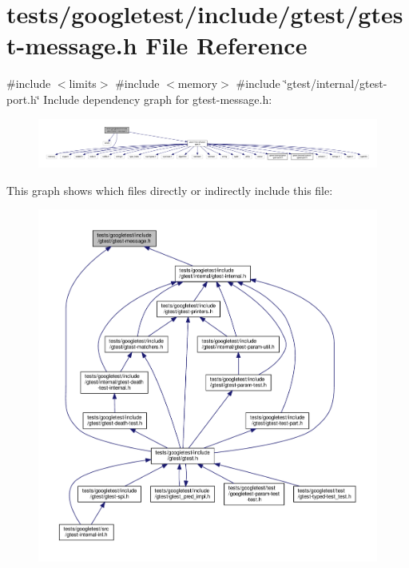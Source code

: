 \hypertarget{gtest-message_8h}{}\section{tests/googletest/include/gtest/gtest-\/message.h File Reference}
\label{gtest-message_8h}
{\ttfamily \#include $<$limits$>$}\newline
{\ttfamily \#include $<$memory$>$}\newline
{\ttfamily \#include \char`\"{}gtest/internal/gtest-\/port.\+h\char`\"{}}\newline
Include dependency graph for gtest-\/message.h\+:\nopagebreak
\begin{figure}[H]
\begin{center}
\leavevmode
\includegraphics[width=350pt]{gtest-message_8h__incl}
\end{center}
\end{figure}
This graph shows which files directly or indirectly include this file\+:\nopagebreak
\begin{figure}[H]
\begin{center}
\leavevmode
\includegraphics[width=350pt]{gtest-message_8h__dep__incl}
\end{center}
\end{figure}
